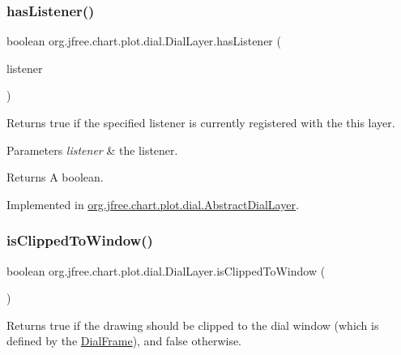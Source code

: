 \subsubsection{\texorpdfstring{has\+Listener()}{hasListener()}}
{\footnotesize\ttfamily boolean org.\+jfree.\+chart.\+plot.\+dial.\+Dial\+Layer.\+has\+Listener (\begin{DoxyParamCaption}\item[{Event\+Listener}]{listener }\end{DoxyParamCaption})}

Returns {\ttfamily true} if the specified listener is currently registered with the this layer.


\begin{DoxyParams}{Parameters}
{\em listener} & the listener.\\
\hline
\end{DoxyParams}
\begin{DoxyReturn}{Returns}
A boolean. 
\end{DoxyReturn}


Implemented in \mbox{\hyperlink{classorg_1_1jfree_1_1chart_1_1plot_1_1dial_1_1_abstract_dial_layer_ae5ce22720d24ab3fb6cf93ddf2714a82}{org.\+jfree.\+chart.\+plot.\+dial.\+Abstract\+Dial\+Layer}}.

\mbox{\label{interfaceorg_1_1jfree_1_1chart_1_1plot_1_1dial_1_1_dial_layer_a822eeadbe31b48827497714abeda2190}} 
\subsubsection{\texorpdfstring{is\+Clipped\+To\+Window()}{isClippedToWindow()}}
{\footnotesize\ttfamily boolean org.\+jfree.\+chart.\+plot.\+dial.\+Dial\+Layer.\+is\+Clipped\+To\+Window (\begin{DoxyParamCaption}{ }\end{DoxyParamCaption})}

Returns {\ttfamily true} if the drawing should be clipped to the dial window (which is defined by the \mbox{\hyperlink{interfaceorg_1_1jfree_1_1chart_1_1plot_1_1dial_1_1_dial_frame}{Dial\+Frame}}), and {\ttfamily false} otherwise.

